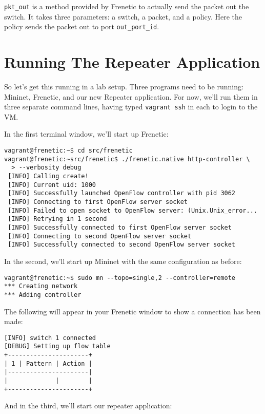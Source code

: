 \lstinline{pkt_out} is a method provided by Frenetic to actually send the packet out the switch.  It takes three 
parameters: a switch, a packet, and a policy.  
Here the policy sends the packet out to port \lstinline{out_port_id}.   

\section{Running The Repeater Application}

So let's get this running in a lab setup.  
Three programs need to be running:  Mininet, Frenetic, and our new Repeater application.  
For now, we'll run them in three separate command lines, having typed \lstinline{vagrant ssh} in each
to login to the VM.

In the first terminal window, we'll start up Frenetic:

\begin{lstlisting}[style=BashInputStyle]
vagrant@frenetic:~$ cd src/frenetic
vagrant@frenetic:~src/frenetic$ ./frenetic.native http-controller \
  > --verbosity debug
 [INFO] Calling create!
 [INFO] Current uid: 1000
 [INFO] Successfully launched OpenFlow controller with pid 3062
 [INFO] Connecting to first OpenFlow server socket
 [INFO] Failed to open socket to OpenFlow server: (Unix.Unix_error...
 [INFO] Retrying in 1 second
 [INFO] Successfully connected to first OpenFlow server socket
 [INFO] Connecting to second OpenFlow server socket
 [INFO] Successfully connected to second OpenFlow server socket 
\end{lstlisting}

In the second, we'll start up Mininet with the same configuration as before:

\begin{lstlisting}[style=BashInputStyle]
vagrant@frenetic:~$ sudo mn --topo=single,2 --controller=remote
*** Creating network
*** Adding controller
\end{lstlisting}

The following will appear in your Frenetic window to show a connection has been made:

\begin{lstlisting}[style=BashInputStyle]
 [INFO] switch 1 connected
[DEBUG] Setting up flow table
+----------------------+
| 1 | Pattern | Action |
|----------------------|
|             |        |
+----------------------+
\end{lstlisting}

And in the third, we'll start our repeater application:

